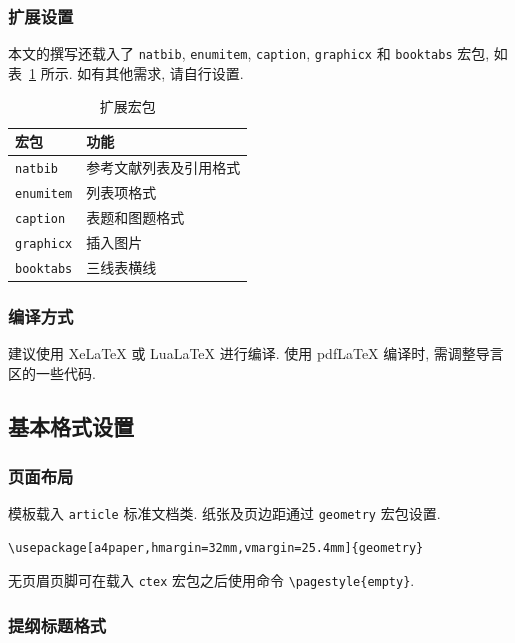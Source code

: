 \documentclass{article}
\begin{document}
\subsubsection{扩展设置}

本文的撰写还载入了 \verb'natbib', \verb'enumitem', \verb'caption', \verb'graphicx' 和 \verb'booktabs' 宏包, 如表~\ref{tab:extra} 所示.
如有其他需求, 请自行设置.

\begin{table}[htbp!]
  \caption{扩展宏包}
  \label{tab:extra}
  \centering
  \begin{tabular}{ll}
    \toprule
    \sffamily 宏包  & \sffamily 功能 \\
    \midrule
    \verb'natbib'   & 参考文献列表及引用格式 \\ 
    \verb'enumitem' & 列表项格式 \\
    \verb'caption'  & 表题和图题格式 \\
    \verb'graphicx' & 插入图片 \\
    \verb'booktabs' & 三线表横线 \\
    \bottomrule
  \end{tabular} 
\end{table}

\subsubsection{编译方式}

建议使用 XeLaTeX 或 LuaLaTeX 进行编译.
使用 pdfLaTeX 编译时, 需调整导言区的一些代码.

\subsection{基本格式设置}

\subsubsection{页面布局}

模板载入 \verb'article' 标准文档类.
纸张及页边距通过 \verb'geometry' 宏包设置.
\begin{verbatim}
\usepackage[a4paper,hmargin=32mm,vmargin=25.4mm]{geometry}
\end{verbatim}
无页眉页脚可在载入 \verb'ctex' 宏包之后使用命令 \verb'\pagestyle{empty}'.

\subsubsection{提纲标题格式}
\end{document}
